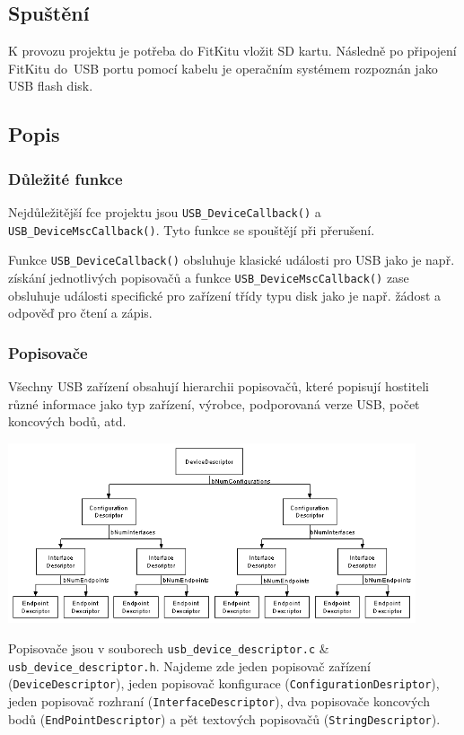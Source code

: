 \documentclass[a4paper, 11pt]{article}
\begin{document}
\subsection{Spuštění}

K provozu projektu je potřeba do FitKitu vložit SD kartu. Následně po připojení FitKitu do~USB portu pomocí kabelu je operačním systémem rozpoznán jako USB flash disk.

\subsection{Popis}

\subsubsection{Důležité funkce}

Nejdůležitější fce projektu jsou \texttt{USB\_DeviceCallback()} a \texttt{USB\_DeviceMscCallback()}. Tyto funkce se spouštějí při přerušení.

Funkce \texttt{USB\_DeviceCallback()} obsluhuje klasické události pro USB  jako je např. získání jednotlivých popisovačů a funkce \texttt{USB\_DeviceMscCallback()} zase obsluhuje události specifické pro zařízení třídy typu disk jako je např. žádost a odpověď pro čtení a zápis.

\subsubsection{Popisovače}

Všechny USB zařízení obsahují hierarchii popisovačů, které popisují hostiteli různé informace jako typ zařízení, výrobce, podporovaná verze USB, počet koncových bodů, atd.

\begin{center}
	\medskip
	\includegraphics[width=0.9\textwidth]{desctree}
	\medskip
\end{center}

Popisovače jsou v souborech \texttt{usb\_device\_descriptor.c} \& \texttt{usb\_device\_descriptor.h}.
Najdeme zde jeden popisovač zařízení (\texttt{DeviceDescriptor}), jeden popisovač konfigurace (\texttt{ConfigurationDesriptor}), jeden popisovač rozhraní (\texttt{InterfaceDescriptor}), dva popisovače koncových bodů (\texttt{EndPointDescriptor}) a pět textových popisovačů \linebreak (\texttt{StringDescriptor}).
\end{document}
